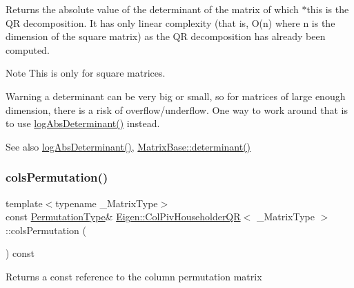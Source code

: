 \begin{DoxyReturn}{Returns}
the absolute value of the determinant of the matrix of which $\ast$this is the QR decomposition. It has only linear complexity (that is, O(n) where n is the dimension of the square matrix) as the QR decomposition has already been computed.
\end{DoxyReturn}
\begin{DoxyNote}{Note}
This is only for square matrices.
\end{DoxyNote}
\begin{DoxyWarning}{Warning}
a determinant can be very big or small, so for matrices of large enough dimension, there is a risk of overflow/underflow. One way to work around that is to use \mbox{\hyperlink{class_eigen_1_1_col_piv_householder_q_r_afdc29438a335871f67449c253369ce12}{log\+Abs\+Determinant()}} instead.
\end{DoxyWarning}
\begin{DoxySeeAlso}{See also}
\mbox{\hyperlink{class_eigen_1_1_col_piv_householder_q_r_afdc29438a335871f67449c253369ce12}{log\+Abs\+Determinant()}}, \mbox{\hyperlink{class_eigen_1_1_matrix_base_a7ad8f77004bb956b603bb43fd2e3c061}{Matrix\+Base\+::determinant()}} 
\end{DoxySeeAlso}
\mbox{\label{class_eigen_1_1_col_piv_householder_q_r_ab6ad43e6a6fb75726eae0d5499948f4a}} 
\subsubsection{\texorpdfstring{colsPermutation()}{colsPermutation()}}
{\footnotesize\ttfamily template$<$typename \+\_\+\+Matrix\+Type$>$ \\
const \mbox{\hyperlink{class_eigen_1_1_permutation_matrix}{Permutation\+Type}}\& \mbox{\hyperlink{class_eigen_1_1_col_piv_householder_q_r}{Eigen\+::\+Col\+Piv\+Householder\+QR}}$<$ \+\_\+\+Matrix\+Type $>$\+::cols\+Permutation (\begin{DoxyParamCaption}{ }\end{DoxyParamCaption}) const\hspace{0.3cm}{\ttfamily [inline]}}

\begin{DoxyReturn}{Returns}
a const reference to the column permutation matrix 
\end{DoxyReturn}
\mbox{\label{class_eigen_1_1_col_piv_householder_q_r_a608016776319abe8fe96b85f83c8dd3d}} 
